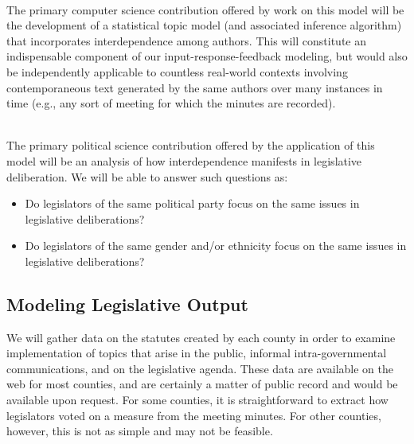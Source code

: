 ~\\
 The primary computer
science contribution offered by work on this model will be the
development of a statistical topic model (and associated inference
algorithm) that incorporates interdependence among authors. This will
constitute an indispensable component of our input-response-feedback
modeling, but would also be independently applicable to countless
real-world contexts involving contemporaneous text generated by the
same authors over many instances in time (e.g., any sort of meeting
for which the minutes are recorded).

~\\
 The primary political science contribution offered by the application of this model will be an analysis of how interdependence manifests in legislative deliberation. We will be able to answer such questions as:
\begin{itemize}
\item Do legislators of the same political party focus on the same issues in legislative deliberations?
\item Do legislators of the same gender and/or ethnicity focus on the same issues in legislative deliberations?
\end{itemize}


\subsection{Modeling Legislative Output}


  We will gather data on the statutes created by each county in order to examine implementation of topics that arise in the public, informal intra-governmental communications, and on the legislative agenda. These data are available on the web for most counties, and are certainly a matter of public record and would be available upon request. For some counties, it is straightforward to extract how legislators voted on a measure from the meeting minutes. For other counties, however, this is not as simple and may not be feasible.

